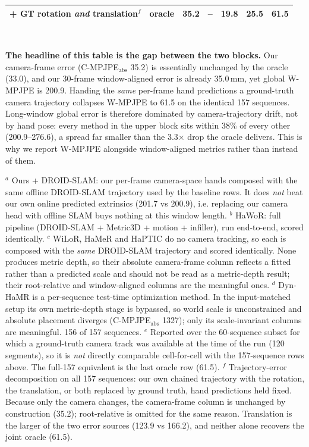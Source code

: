 \documentclass[border=5pt]{standalone}
\newcommand{\na}{--}
\begin{document}
\begin{minipage}{18.6cm}
\begin{tabular}{@{}llccccc@{}}
\rowcolor{oraclebg}
\quad + GT rotation \emph{and} translation$^{f}$ & oracle & 35.2 & \na & 19.8 & 25.5 & 61.5 \\
\bottomrule
\end{tabular}\\[8pt]
\begin{minipage}{18.2cm}
\footnotesize
\textbf{The headline of this table is the gap between the two blocks.} Our camera-frame error
(C-MPJPE$_{\text{abs}}$ 35.2) is essentially unchanged by the oracle (33.0), and our 30-frame
window-aligned error is already 35.0\,mm, yet global W-MPJPE is 200.9. Handing the \emph{same}
per-frame hand predictions a ground-truth camera trajectory collapses W-MPJPE to 61.5 on the
identical 157 sequences. Long-window global error is therefore dominated by camera-trajectory
drift, not by hand pose: every method in the upper block sits within 38\% of every other
(200.9--276.6), a spread far smaller than the 3.3$\times$ drop the oracle delivers. This is why we
report W-MPJPE alongside window-aligned metrics rather than instead of them.

$^{a}$ Ours + DROID-SLAM: our per-frame camera-space hands composed with the same offline DROID-SLAM
trajectory used by the baseline rows. It does \emph{not} beat our own online predicted extrinsics
(201.7 vs 200.9), i.e. replacing our camera head with offline SLAM buys nothing at this window length.
$^{b}$ HaWoR: full pipeline (DROID-SLAM + Metric3D + motion + infiller), run end-to-end, scored
identically. $^{c}$ WiLoR, HaMeR and HaPTIC do no camera tracking, so each is composed with the
\emph{same} DROID-SLAM trajectory and scored identically. None produces metric depth, so their
absolute camera-frame column reflects a fitted rather than a predicted scale and should not be read
as a metric-depth result; their root-relative and window-aligned columns are the meaningful ones.
$^{d}$ Dyn-HaMR is a per-sequence test-time optimization method. In the input-matched setup its own
metric-depth stage is bypassed, so world scale is unconstrained and absolute placement diverges
(C-MPJPE$_{\text{abs}}$ 1327); only its scale-invariant columns are meaningful. 156 of 157 sequences.
$^{e}$ Reported over the 60-sequence subset for which a ground-truth camera track was available at
the time of the run (120 segments), so it is \emph{not} directly comparable cell-for-cell with the
157-sequence rows above. The full-157 equivalent is the last oracle row (61.5).
$^{f}$ Trajectory-error decomposition on all 157 sequences: our own chained trajectory with the
rotation, the translation, or both replaced by ground truth, hand predictions held fixed. Because
only the camera changes, the camera-frame column is unchanged by construction (35.2); root-relative
is omitted for the same reason. Translation is the larger of the two error sources
(123.9 vs 166.2), and neither alone recovers the joint oracle (61.5).
\end{minipage}
\end{minipage}
\end{document}
